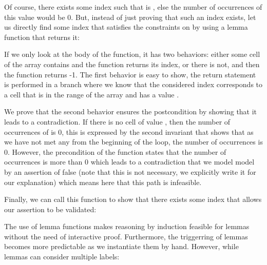


Of course, there exists some index  such that 
is , else the number of occurrences of this value would be $0$.
But, instead of just proving that such an index exists, let us directly find
some index that satisfies the constraints on  by using a lemma
function that returns it:






If we only look at the body of the function, it has two behaviors: either some
cell of the array contains  and the function returns its index, or
there is not, and then the function returns -1. The first behavior is easy to
show, the return statement is performed in a branch where we know that the
considered index corresponds to a cell that is in the range of the array and has
a value .



We prove that the second behavior ensures the postcondition by showing that it
leads to a contradiction. If there is no cell of value , then
the number of occurrences of  is 0, this is expressed by the
second invariant that shows that as we have not met any  from
the beginning of the loop,
the number of occurrences is 0. However, the precondition of the
function states that the number of occurrences is more than $0$ which leads to
a contradiction that we model model by an assertion of false (note that this is
not necessary, we explicitly write it for our explanation) which means here that
this path is infeasible.



Finally, we can call this function to show that there exists some index that
allows our assertion to be validated:






The use of lemma functions makes reasoning by induction feasible for lemmas
without the need of interactive proof. Furthermore, the triggerring of lemmas
becomes more predictable as we instantiate them by hand. However, while lemmas
can consider multiple labels:



